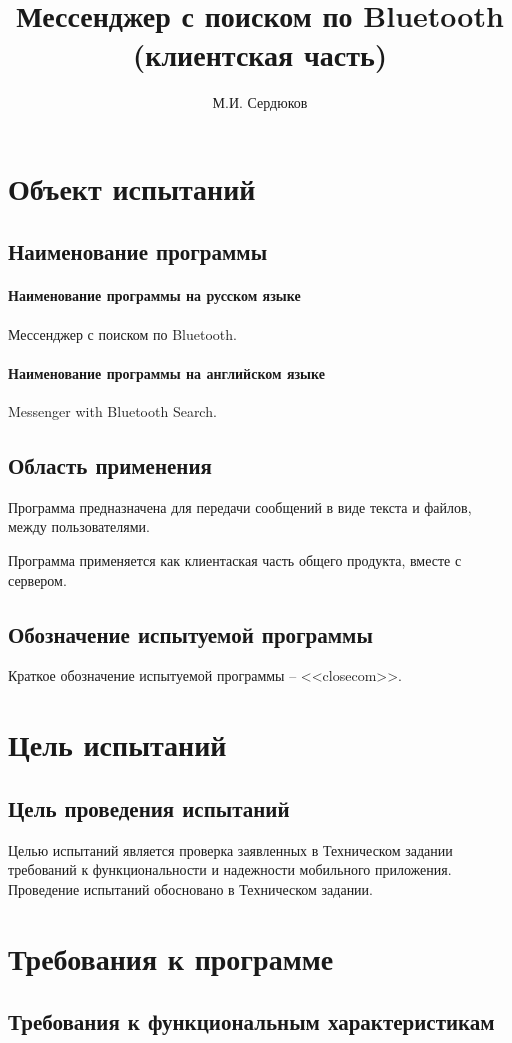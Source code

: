 \documentclass[testmethods]{espd}
\author{М.И. Сердюков}
\title{Мессенджер с поиском по Bluetooth\\(клиентская часть)}
\begin{document}
\tableofcontents

\section{Объект испытаний}
\subsection{Наименование программы}
\paragraph{Наименование программы на русском языке}
Мессенджер с поиском по Bluetooth.
\paragraph{Наименование программы на английском языке}
Messenger with Bluetooth Search.

\subsection{Область применения}
Программа предназначена для передачи сообщений в виде текста и файлов, между пользователями.

Программа применяется как клиентаская часть общего продукта, вместе с сервером.

\subsection{Обозначение испытуемой программы}
Краткое обозначение испытуемой программы -- <<closecom>>.

\section{Цель испытаний}
\subsection{Цель проведения испытаний}
Целью испытаний является проверка заявленных в Техническом задании требований к функциональности и надежности мобильного приложения. Проведение испытаний обосновано в Техническом задании.

\section{Требования к программе}
\subsection{Требования к функциональным характеристикам}
\end{document}
